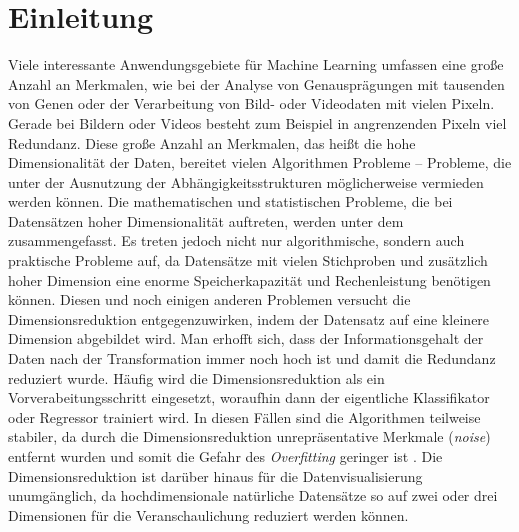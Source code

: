 \chapter{Einleitung}
\label{ch:Enleitung}

Viele interessante Anwendungsgebiete für Machine Learning umfassen eine große Anzahl an Merkmalen,
wie bei der Analyse von Genausprägungen mit tausenden von Genen \parencite[siehe z.B.][]{Parmigiani.2003} oder der Verarbeitung von Bild- oder Videodaten mit vielen
Pixeln. Gerade bei Bildern oder Videos besteht zum Beispiel in angrenzenden Pixeln viel Redundanz.
Diese große Anzahl an Merkmalen, das heißt die hohe Dimensionalität der Daten, bereitet vielen
Algorithmen Probleme -- Probleme, die unter der Ausnutzung der Abhängigkeitsstrukturen
möglicherweise vermieden werden können. Die mathematischen und statistischen Probleme, die bei Datensätzen hoher
Dimensionalität auftreten, werden unter dem  \parencite{Bellman.1957} zusammengefasst. Es treten jedoch nicht nur algorithmische, sondern auch
praktische Probleme auf, da Datensätze mit vielen Stichproben und zusätzlich hoher Dimension eine
enorme Speicherkapazität und Rechenleistung benötigen können.
Diesen und noch einigen anderen Problemen versucht die Dimensionsreduktion entgegenzuwirken, indem
der Datensatz auf eine kleinere Dimension abgebildet wird. Man erhofft sich, dass der
Informationsgehalt der Daten nach der Transformation immer noch hoch ist und damit die Redundanz
reduziert wurde. Häufig wird die Dimensionsreduktion als ein Vorverabeitungsschritt eingesetzt,
woraufhin dann der eigentliche Klassifikator oder Regressor trainiert wird. In diesen Fällen sind
die Algorithmen teilweise stabiler, da durch die Dimensionsreduktion unrepräsentative Merkmale
(\textit{noise}) entfernt wurden und somit die Gefahr des \textit{Overfitting} geringer ist \parencites[siehe]{Plastria.2008}{MustafaAbdulSalam.2021}. Die Dimensionsreduktion ist darüber hinaus
für die Datenvisualisierung unumgänglich, da hochdimensionale natürliche Datensätze so auf zwei
oder drei Dimensionen für die Veranschaulichung reduziert werden können.

